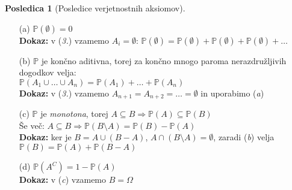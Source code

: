 \documentclass[11pt]{article}
\theoremstyle{definition}
\theoremstyle{definition}
\theoremstyle{definition}
\theoremstyle{theorem}
\newtheorem*{posledica}{Posledica}
\theoremstyle{theorem}
\begin{document}
\begin{posledica}[Posledice verjetnostnih aksiomov]
~
\begin{enumerate}

\item[(a)] $\mathbb{P}(\emptyset) = 0$ \\
\textbf{Dokaz:} v (\textit{3.}) vzamemo $A_i = \emptyset$: 
$\mathbb{P}(\emptyset) = \mathbb{P}(\emptyset) + \mathbb{P}(\emptyset) + \mathbb{P}(\emptyset) + \ldots$

\item[(b)] $\mathbb{P}$ je končno aditivna, torej za končno mnogo paroma nerazdružljivih dogodkov velja: \\
$\mathbb{P}(A_1 \cup \ldots \cup A_n) = \mathbb{P}(A_1) + \ldots + \mathbb{P}(A_n)$ \\
\textbf{Dokaz:} v (\textit{3.}) vzamemo $A_{n+1} = A_{n+2} = \ldots = \emptyset$ in uporabimo (\textit{a})

\item[(c)] $\mathbb{P}$ je \textit{monotona}, torej $A \subseteq B \Rightarrow \mathbb{P}(A) \subseteq \mathbb{P}(B)$ \\
Še več: $A \subseteq B \Rightarrow \mathbb{P}(B \setminus A) = \mathbb{P}(B) - \mathbb{P}(A)$ \\
\textbf{Dokaz:} ker je $B = A \cup (B-A)$, $A \cap (B \setminus A) = \emptyset$, zaradi (\textit{b}) velja $\mathbb{P}(B) = \mathbb{P}(A) + \mathbb{P}(B-A)$

\item[(d)] $\mathbb{P}(A^C) = 1 - \mathbb{P}(A)$ \\
\textbf{Dokaz:} v (\textit{c}) vzamemo $B = \Omega$


\end{enumerate}
\end{posledica}
\end{document}
